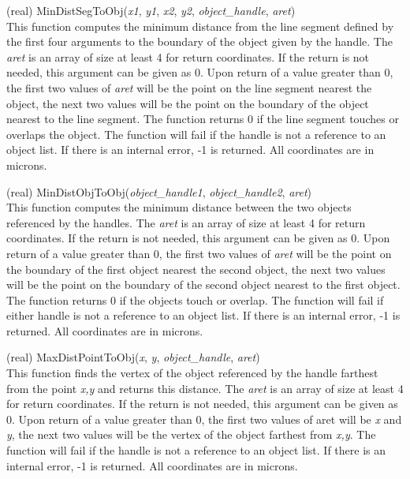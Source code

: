 \begin{description}
\item{(real) \vt MinDistSegToObj({\it x1\/}, {\it y1\/}, {\it x2\/},
 {\it y2\/}, {\it object\_handle\/}, {\it aret\/})}\\
This function computes the minimum distance from the line segment
defined by the first four arguments to the boundary of the object
given by the handle.  The {\it aret} is an array of size at least 4
for return coordinates.  If the return is not needed, this argument
can be given as 0.  Upon return of a value greater than 0, the first
two values of {\it aret} will be the point on the line segment nearest
the object, the next two values will be the point on the boundary of
the object nearest to the line segment.  The function returns 0 if the
line segment touches or overlaps the object.  The function will fail
if the handle is not a reference to an object list.  If there is an
internal error, -1 is returned.  All coordinates are in microns.

\item{(real) \vt MinDistObjToObj({\it object\_handle1\/},
 {\it object\_handle2\/}, {\it aret\/})}\\
This function computes the minimum distance between the two objects
referenced by the handles.  The {\it aret} is an array of size at
least 4 for return coordinates.  If the return is not needed, this
argument can be given as 0.  Upon return of a value greater than 0,
the first two values of {\it aret} will be the point on the boundary
of the first object nearest the second object, the next two values
will be the point on the boundary of the second object nearest to the
first object.  The function returns 0 if the objects touch or overlap. 
The function will fail if either handle is not a reference to an
object list.  If there is an internal error, -1 is returned.  All
coordinates are in microns.

\item{(real) \vt MaxDistPointToObj({\it x\/}, {\it y\/},
 {\it object\_handle\/}, {\it aret\/})}\\
This function finds the vertex of the object referenced by the handle
farthest from the point {\it x,y} and returns this distance.  The {\it
aret} is an array of size at least 4 for return coordinates.  If the
return is not needed, this argument can be given as 0.  Upon return of
a value greater than 0, the first two values of aret will be {\it x}
and {\it y}, the next two values will be the vertex of the object
farthest from {\it x,y\/}.  The function will fail if the handle is
not a reference to an object list.  If there is an internal error, -1
is returned.  All coordinates are in microns.


\end{description}
